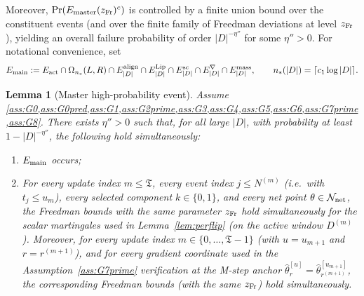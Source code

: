 \documentclass{statsoc}
\newtheorem{lemma}[lemma]{Lemma}
\newcommand{\1}{\mathbbm{1}}
\newcommand{\Tmax}{\mathfrak{T}}
\begin{document}
Moreover, $\Pr(E_{\mathrm{master}}(z_{\rm Fr})^c)$ is controlled by a finite union bound over the constituent events
(and over the finite family of Freedman deviations at level $z_{\rm Fr}$), yielding an overall failure probability
of order $|D|^{-\eta''}$ for some $\eta''>0$. For notational convenience, set
\[
E_{\rm main}
:=E_{\rm act}\cap \Omega_{n_*}(L,R)\cap E^{\rm align}_{|D|}
\cap E^{\rm Lip}_{|D|}\cap E^{\rm sc}_{|D|}\cap E^{\nabla}_{|D|}\cap E^{\rm mass}_{|D|},
\qquad n_*(|D|)=\lceil c_1\log|D|\rceil.
\]


\begin{lemma}[Master high-probability event]\label{lem:master}
Assume \cref{ass:G0,ass:G0pred,ass:G1,ass:G2prime,ass:G3,ass:G4,ass:G5,ass:G6,ass:G7prime,ass:G8}. There exists $\eta''>0$ such that, for all large $|D|$, with probability at least $1-|D|^{-\eta''}$, the following hold simultaneously:
\begin{enumerate}[nosep,label=(\roman*)]
\item $E_{\rm main}$ occurs;
\item For every update index $m\le \Tmax$, every event index $j \le N^{(m)}$ (i.e.\ with $t_j\le u_m$),
every selected component $k\in\{0,1\}$, and every net point $\theta\in\mathcal N_{\rm net}$,
the Freedman bounds with the same parameter $z_{\rm Fr}$ hold simultaneously for the scalar martingales used in Lemma~\ref{lem:perflip} (on the active window $D^{(m)}$). Moreover, for every update index $m\in\{0,\dots,\Tmax-1\}$ (with $u=u_{m+1}$ and $r=r^{(m+1)}$), and for every gradient coordinate used in the Assumption~\ref{ass:G7prime} verification at the M-step anchor $\hat\theta_{r}^{[u]}=\hat\theta_{r^{(m+1)}}^{[u_{m+1}]}$, the corresponding Freedman bounds (with the same $z_{\rm Fr}$) hold simultaneously.
\end{enumerate}
\end{lemma}
\end{document}
